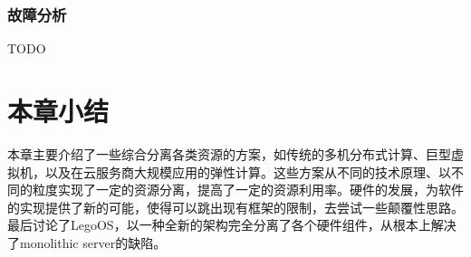 \subsubsection{故障分析}

TODO


\section{本章小结}

本章主要介绍了一些综合分离各类资源的方案，如传统的多机分布式计算、巨型虚拟机，以及在云服务商大规模应用的弹性计算。这些方案从不同的技术原理、以不同的粒度实现了一定的资源分离，提高了一定的资源利用率。硬件的发展，为软件的实现提供了新的可能，使得可以跳出现有框架的限制，去尝试一些颠覆性思路。最后讨论了LegoOS，以一种全新的架构完全分离了各个硬件组件，从根本上解决了monolithic server的缺陷。
